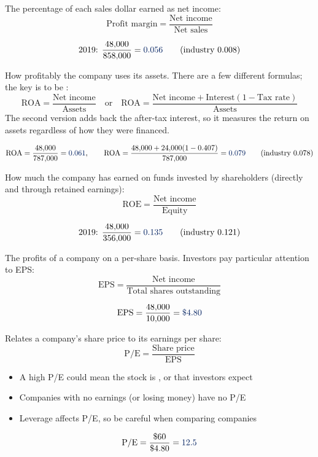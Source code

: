 \begin{definition}
    The percentage of each sales dollar earned as net income:
    \[\boxed{\text{Profit margin} = \frac{\text{Net income}}{\text{Net sales}}}\]
\end{definition}
\[\text{2019: } \frac{48{,}000}{858{,}000} = \db{0.056} \qquad (\text{industry } 0.008)\]

\begin{definition}
    How profitably the company uses its assets. There are a few different
    formulas; the key is to be :
    \[\boxed{\text{ROA} = \frac{\text{Net income}}{\text{Assets}} \quad\text{or}\quad \text{ROA} = \frac{\text{Net income} + \text{Interest}(1 - \text{Tax rate})}{\text{Assets}}}\]
    The second version adds back the after-tax interest, so it measures the
    return on assets regardless of how they were financed.
\end{definition}
\[\text{ROA} = \frac{48{,}000}{787{,}000} = \db{0.061}, \qquad \text{ROA} = \frac{48{,}000 + 24{,}000(1 - 0.407)}{787{,}000} = \db{0.079} \qquad (\text{industry } 0.078)\]

\begin{definition}
    How much the company has earned on funds invested by shareholders
    (directly and through retained earnings):
    \[\boxed{\text{ROE} = \frac{\text{Net income}}{\text{Equity}}}\]
\end{definition}
\[\text{2019: } \frac{48{,}000}{356{,}000} = \db{0.135} \qquad (\text{industry } 0.121)\]

\begin{definition}
    The profits of a company on a per-share basis. Investors pay particular
    attention to EPS:
    \[\boxed{\text{EPS} = \frac{\text{Net income}}{\text{Total shares outstanding}}}\]
\end{definition}
\[\text{EPS} = \frac{48{,}000}{10{,}000} = \db{\$4.80}\]

\begin{definition}
    Relates a company's share price to its earnings per share:
    \[\boxed{\text{P/E} = \frac{\text{Share price}}{\text{EPS}}}\]
    \begin{itemize}
        \item A high P/E could mean the stock is , or that investors expect 
        \item Companies with no earnings (or losing money) have no P/E
        \item Leverage affects P/E, so be careful when comparing companies
    \end{itemize}
\end{definition}
\[\text{P/E} = \frac{\$60}{\$4.80} = \db{12.5}\]

